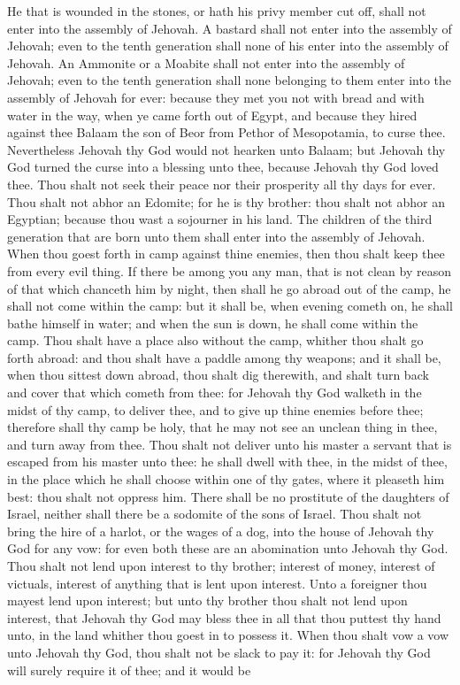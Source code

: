 He that is wounded in the stones, or hath his privy member cut off, shall not enter into the assembly of Jehovah.  A bastard shall not enter into the assembly of Jehovah; even to the tenth generation shall none of his enter into the assembly of Jehovah.  An Ammonite or a Moabite shall not enter into the assembly of Jehovah; even to the tenth generation shall none belonging to them enter into the assembly of Jehovah for ever: because they met you not with bread and with water in the way, when ye came forth out of Egypt, and because they hired against thee Balaam the son of Beor from Pethor of Mesopotamia, to curse thee. Nevertheless Jehovah thy God would not hearken unto Balaam; but Jehovah thy God turned the curse into a blessing unto thee, because Jehovah thy God loved thee. Thou shalt not seek their peace nor their prosperity all thy days for ever.  Thou shalt not abhor an Edomite; for he is thy brother: thou shalt not abhor an Egyptian; because thou wast a sojourner in his land. The children of the third generation that are born unto them shall enter into the assembly of Jehovah.  When thou goest forth in camp against thine enemies, then thou shalt keep thee from every evil thing. If there be among you any man, that is not clean by reason of that which chanceth him by night, then shall he go abroad out of the camp, he shall not come within the camp: but it shall be, when evening cometh on, he shall bathe himself in water; and when the sun is down, he shall come within the camp. Thou shalt have a place also without the camp, whither thou shalt go forth abroad: and thou shalt have a paddle among thy weapons; and it shall be, when thou sittest down abroad, thou shalt dig therewith, and shalt turn back and cover that which cometh from thee: for Jehovah thy God walketh in the midst of thy camp, to deliver thee, and to give up thine enemies before thee; therefore shall thy camp be holy, that he may not see an unclean thing in thee, and turn away from thee.  Thou shalt not deliver unto his master a servant that is escaped from his master unto thee: he shall dwell with thee, in the midst of thee, in the place which he shall choose within one of thy gates, where it pleaseth him best: thou shalt not oppress him.  There shall be no prostitute of the daughters of Israel, neither shall there be a sodomite of the sons of Israel. Thou shalt not bring the hire of a harlot, or the wages of a dog, into the house of Jehovah thy God for any vow: for even both these are an abomination unto Jehovah thy God.  Thou shalt not lend upon interest to thy brother; interest of money, interest of victuals, interest of anything that is lent upon interest. Unto a foreigner thou mayest lend upon interest; but unto thy brother thou shalt not lend upon interest, that Jehovah thy God may bless thee in all that thou puttest thy hand unto, in the land whither thou goest in to possess it.  When thou shalt vow a vow unto Jehovah thy God, thou shalt not be slack to pay it: for Jehovah thy God will surely require it of thee; and it would be 
